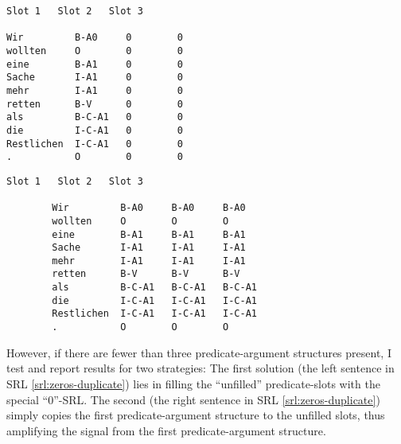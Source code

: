 \begingroup
\begin{srl}[!h]
  \begin{minipage}{0.45\linewidth}
  \vspace{0pt}
    \begin{BVerbatim}[commandchars=\\\{\}, fontsize=\footnotesize]
            Slot 1   Slot 2   Slot 3

Wir         B-A0     0        0
wollten     O        0        0
eine        B-A1     0        0
Sache       I-A1     0        0
mehr        I-A1     0        0
retten      B-V      0        0
als         B-C-A1   0        0
die         I-C-A1   0        0
Restlichen  I-C-A1   0        0
.           O        0        0
      \end{BVerbatim}
  \end{minipage}
  \begin{minipage}{0.45\linewidth}
  \vspace{0pt}
    \begin{BVerbatim}[commandchars=\\\{\}, fontsize=\footnotesize]
                    Slot 1   Slot 2   Slot 3

        Wir         B-A0     B-A0     B-A0
        wollten     O        O        O
        eine        B-A1     B-A1     B-A1
        Sache       I-A1     I-A1     I-A1
        mehr        I-A1     I-A1     I-A1
        retten      B-V      B-V      B-V
        als         B-C-A1   B-C-A1   B-C-A1
        die         I-C-A1   I-C-A1   I-C-A1
        Restlichen  I-C-A1   I-C-A1   I-C-A1
        .           O        O        O
    \end{BVerbatim}
  \end{minipage}
\end{srl}
\label{srl:zeros-duplicate}
\endgroup


However, if there are fewer than three predicate-argument structures
present, I test and report results for two strategies: The first solution (the left sentence
in SRL \ref{srl:zeros-duplicate}) lies in filling the ``unfilled'' predicate-slots with the
special ``0''-SRL. The second (the right sentence in SRL \ref{srl:zeros-duplicate}) simply
copies the first predicate-argument structure to the unfilled slots, thus amplifying the signal
from the first predicate-argument structure.

